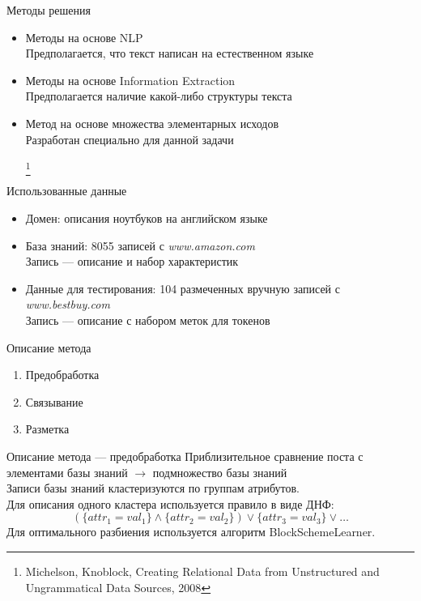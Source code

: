 \documentclass[14pt,mathserif,aspectratio=43]{beamer}
\newcommand\articlenote[1]{%
  \begingroup%
  \renewcommand\thefootnote{}\footnote{#1}%
  \addtocounter{footnote}{-1}%
  \endgroup%
}
\begin{document}
\begin{frame}{Методы решения}
    \begin{itemize}
	    \item Методы на основе NLP\\
	    Предполагается, что текст написан на естественном языке

	    \item Методы на основе Information Extraction\\
	    Предполагается наличие какой-либо структуры текста

		\item Метод на основе множества элементарных исходов\\
		Разработан специально для данной задачи

		\articlenote{Michelson, Knoblock, Creating Relational Data from Unstructured and Ungrammatical Data Sources, 2008} 
    \end{itemize}
\end{frame}

\begin{frame}{Использованные данные}
    \begin{itemize}
    	\item Домен: описания ноутбуков на английском языке

	    \item База знаний: 8055 записей с \textit{www.amazon.com}\\
	    Запись --- описание и набор характеристик

	    \item Данные для тестирования: 104 размеченных вручную записей с \textit{www.bestbuy.com}\\ 
	    Запись --- описание с набором меток для токенов
    \end{itemize}
\end{frame}

\begin{frame}{Описание метода}
    \begin{enumerate}
    	\item Предобработка

	    \item Связывание

	    \item Разметка
    \end{enumerate}

\end{frame}

\begin{frame}{Описание метода --- предобработка}
    	Приблизительное сравнение поста с элементами базы знаний $\to$ подмножество базы знаний\\
    	Записи базы знаний кластеризуются по группам атрибутов.\\
    	Для описания одного кластера используется правило в виде ДНФ:\\
    	\[
    	(\{attr_1 = val_1\} \land \{attr_2 = val_2\}) \vee \{attr_3 = val_3\} \vee \ldots
    	\]
    	\medskip
    	Для оптимального разбиения используется алгоритм BlockSchemeLearner.\\
\end{frame}
\end{document}
